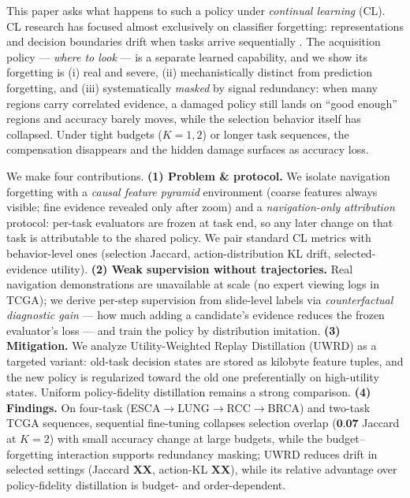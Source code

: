 \documentclass{article}
\newcommand{\xx}[1]{\textbf{#1}}          %
\newcommand{\method}{UWRD}               %
\begin{document}
This paper asks what happens to such a policy under \emph{continual learning}
(CL). CL research has focused almost exclusively on classifier forgetting:
representations and decision boundaries drift when tasks arrive sequentially
\cite{kirkpatrick2017ewc,li2017lwf,rebuffi2017icarl}. The acquisition policy
--- \emph{where to look} --- is a separate learned capability, and we show its
forgetting is (i) real and severe, (ii) mechanistically distinct from
prediction forgetting, and (iii) systematically \emph{masked} by signal
redundancy: when many regions carry correlated evidence, a damaged policy
still lands on ``good enough'' regions and accuracy barely moves, while the
selection behavior itself has collapsed. Under tight budgets ($K{=}1,2$) or
longer task sequences, the compensation disappears and the hidden damage
surfaces as accuracy loss.

We make four contributions. \textbf{(1) Problem \& protocol.} We isolate
navigation forgetting with a \emph{causal feature pyramid} environment
(coarse features always visible; fine evidence revealed only after zoom) and
a \emph{navigation-only attribution} protocol: per-task evaluators are frozen
at task end, so any later change on that task is attributable to the shared
policy. We pair standard CL metrics with behavior-level ones (selection
Jaccard, action-distribution KL drift, selected-evidence utility).
\textbf{(2) Weak supervision without trajectories.} Real navigation
demonstrations are unavailable at scale (no expert viewing logs in TCGA); we
derive per-step supervision from slide-level labels via \emph{counterfactual
diagnostic gain} --- how much adding a candidate's evidence reduces the frozen
evaluator's loss --- and train the policy by distribution imitation.
\textbf{(3) Mitigation.} We analyze Utility-Weighted Replay Distillation
(\method{}) as a targeted variant: old-task decision states are stored as
kilobyte feature tuples, and the new policy is regularized toward the old one
preferentially on high-utility states. Uniform policy-fidelity distillation
remains a strong comparison.
\textbf{(4) Findings.} On four-task (ESCA$\to$LUNG$\to$RCC$\to$BRCA) and
two-task TCGA sequences, sequential fine-tuning collapses selection overlap
($\xx{0.07}$ Jaccard at $K{=}2$) with small accuracy change at large budgets,
while the budget--forgetting interaction supports redundancy masking;
\method{} reduces drift in selected settings (Jaccard $\xx{XX}$, action-KL
$\xx{XX}$), while its relative advantage over policy-fidelity distillation is
budget- and order-dependent.
\end{document}
